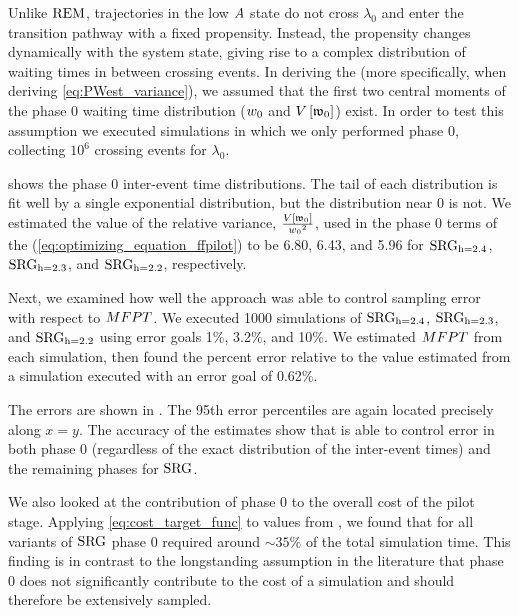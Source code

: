 Unlike $\text{REM}$, trajectories in the low $A$ state do not cross $\lambda_0$ and enter the transition pathway with a fixed propensity. Instead, the propensity changes dynamically with the system state, giving rise to a complex distribution of waiting times in between crossing events. In deriving the \opteq{} (more specifically, when deriving \eqref{eq:PWest_variance}), we assumed that the first two central moments of the phase 0 waiting time distribution ($w_{0}$ and $V \left[ \mathfrak{w}_{0} \right]$) exist. In order to test this assumption we executed simulations in which we only performed phase 0, collecting $10^6$ crossing events for $\lambda_0$.

 shows the phase 0 inter-event time distributions. The tail of each distribution is fit well by a single exponential distribution, but the distribution near 0 is not. We estimated the value of the relative variance, $\frac{V \left[ \mathfrak{w}_{0} \right]}{w_{0} {}^2}$, used in the phase 0 terms of the \opteq{} (\eqref{eq:optimizing_equation_ffpilot}) to be 6.80, 6.43, and 5.96 for $\text{SRG}_\text{h=2.4}$, $\text{SRG}_\text{h=2.3}$, and $\text{SRG}_\text{h=2.2}$, respectively.

Next, we examined how well the  approach was able to control sampling error with respect to $MFPT$. We executed 1000  simulations of $\text{SRG}_\text{h=2.4}$, $\text{SRG}_\text{h=2.3}$, and $\text{SRG}_\text{h=2.2}$ using error goals 1\%, 3.2\%, and 10\%. We estimated $MFPT$ from each simulation, then found the percent error relative to the value estimated from a  simulation executed with an error goal of 0.62\%.

The errors are shown in . The 95th error percentiles are again located precisely along $x=y$. The accuracy of the estimates show that  is able to control error in both phase 0 (regardless of the exact distribution of the inter-event times) and the remaining phases for $\text{SRG}$.

We also looked at the contribution of phase 0 to the overall cost of the pilot stage. Applying \eqref{eq:cost_target_func} to values from , we found that for all variants of $\text{SRG}$ phase 0 required around ${\sim} 35\%$ of the total simulation time. This finding is in contrast to the longstanding assumption in the  literature that phase 0 does not significantly contribute to the cost of a simulation and should therefore be extensively sampled.

